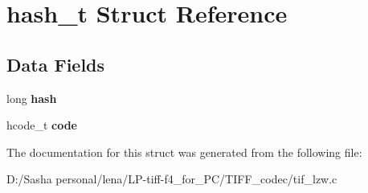 \hypertarget{structhash__t}{}\section{hash\+\_\+t Struct Reference}
\label{structhash__t}
\subsection*{Data Fields}
\begin{DoxyCompactItemize}
\item 
\hypertarget{structhash__t_ac96447c9254d75c480fc472d1db5a3aa}{}long {\bfseries hash}\label{structhash__t_ac96447c9254d75c480fc472d1db5a3aa}

\item 
\hypertarget{structhash__t_a43f7f9bc29a6eeab80ad61ef18fc44cc}{}hcode\+\_\+t {\bfseries code}\label{structhash__t_a43f7f9bc29a6eeab80ad61ef18fc44cc}

\end{DoxyCompactItemize}


The documentation for this struct was generated from the following file\+:\begin{DoxyCompactItemize}
\item 
D\+:/\+Sasha personal/lena/\+L\+P-\/tiff-\/f4\+\_\+for\+\_\+\+P\+C/\+T\+I\+F\+F\+\_\+codec/tif\+\_\+lzw.\+c\end{DoxyCompactItemize}
